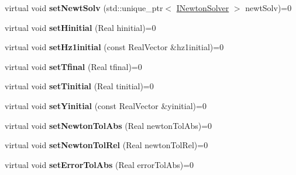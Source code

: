 \begin{DoxyCompactItemize}
\item 
\hypertarget{classIMasterSolver_a31793bc357725f331eea95a41787f0fb}{
virtual void {\bfseries setNewtSolv} (std::unique\_\-ptr$<$ \hyperlink{classINewtonSolver}{INewtonSolver} $>$ newtSolv)=0}
\label{classIMasterSolver_a31793bc357725f331eea95a41787f0fb}

\item 
\hypertarget{classIMasterSolver_a5e34f08940e8202379547f254371f9c0}{
virtual void {\bfseries setHinitial} (Real hinitial)=0}
\label{classIMasterSolver_a5e34f08940e8202379547f254371f9c0}

\item 
\hypertarget{classIMasterSolver_a7b9bf11ed562216986cf8da7a207fddf}{
virtual void {\bfseries setHz1initial} (const RealVector \&hz1initial)=0}
\label{classIMasterSolver_a7b9bf11ed562216986cf8da7a207fddf}

\item 
\hypertarget{classIMasterSolver_a0eab70f9ad2096c997a7da106a848034}{
virtual void {\bfseries setTfinal} (Real tfinal)=0}
\label{classIMasterSolver_a0eab70f9ad2096c997a7da106a848034}

\item 
\hypertarget{classIMasterSolver_a736551977fa76530ca54cc6d784cf24b}{
virtual void {\bfseries setTinitial} (Real tinitial)=0}
\label{classIMasterSolver_a736551977fa76530ca54cc6d784cf24b}

\item 
\hypertarget{classIMasterSolver_a8c9057fbaad0cb899c0b8af5cef8484f}{
virtual void {\bfseries setYinitial} (const RealVector \&yinitial)=0}
\label{classIMasterSolver_a8c9057fbaad0cb899c0b8af5cef8484f}

\item 
\hypertarget{classIMasterSolver_ad2001f3949d56db06d9756f4cc8220f5}{
virtual void {\bfseries setNewtonTolAbs} (Real newtonTolAbs)=0}
\label{classIMasterSolver_ad2001f3949d56db06d9756f4cc8220f5}

\item 
\hypertarget{classIMasterSolver_aa8142f0b762d7117a124b39d2c559036}{
virtual void {\bfseries setNewtonTolRel} (Real newtonTolRel)=0}
\label{classIMasterSolver_aa8142f0b762d7117a124b39d2c559036}

\item 
\hypertarget{classIMasterSolver_a0f4e92764161d30782c07accef08cc2e}{
virtual void {\bfseries setErrorTolAbs} (Real errorTolAbs)=0}
\label{classIMasterSolver_a0f4e92764161d30782c07accef08cc2e}


\end{DoxyCompactItemize}
